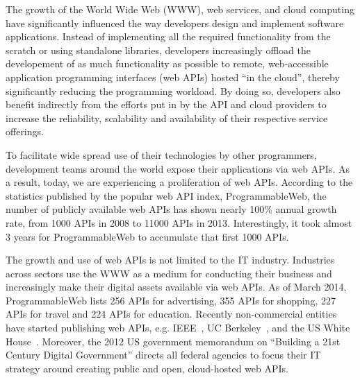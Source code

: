 The growth of the World Wide Web (WWW), web services, and cloud computing have significantly influenced the
way developers design and implement software applications. Instead of implementing all the required functionality from
the scratch or using standalone libraries, developers increasingly offload the
developement of as much functionality as possible to remote,
web-accessible application programming interfaces (web APIs) hosted ``in the
cloud'', thereby significantly reducing the 
programming workload. By doing so, developers also benefit indirectly from the efforts put in 
by the API and cloud providers to 
increase the reliability, scalability and availability of their respective service offerings. 

To facilitate wide spread use of their technologies by other programmers, development teams 
around the world expose their applications via web APIs.
As a result, today, we are experiencing a proliferation of web APIs. According to the 
statistics published by the popular web API index, ProgrammableWeb, the number of publicly available
web APIs has shown nearly 100\% annual growth rate, from 1000 APIs in 2008 to 11000 APIs in 2013. 
Interestingly, it took almost 3 years for ProgrammableWeb to accumulate that
first 1000 APIs. 

The growth and use of web APIs is not limited to the IT industry. 
Industries across sectors use the WWW as a medium for conducting their 
business and increasingly make their digital assets available via web APIs. 
As of March 2014, ProgrammableWeb lists 256 APIs for advertising, 
355 APIs for shopping, 227 APIs for travel and 224 APIs for education.
Recently non-commercial entities have started publishing web 
APIs, e.g. IEEE~\cite{ieeeapis}, UC Berkeley~\cite{ucbapis}, and the US White
House~\cite{whitehouseapis}.  Moreover, the 2012 US government memorandum 
on ``Building a 21st Century Digital Government'' directs all federal agencies to 
focus their IT strategy around creating public and open, cloud-hosted web APIs.

